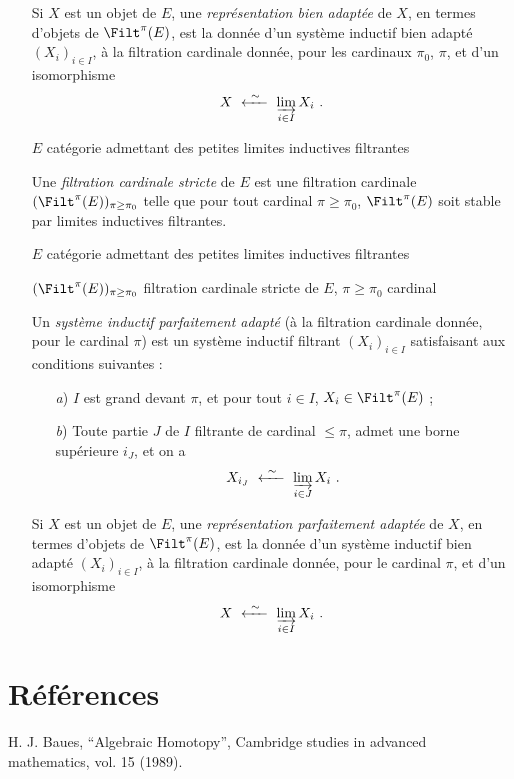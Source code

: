 \begin{itemize}

Si $X$ est un objet de $E$, une \textit{représentation bien adaptée} de $X$, en termes d'objets de $\Filt^{\pi}(E)$, est la donnée d'un système inductif bien adapté $(X_i)_{i\in I}$, à la filtration cardinale donnée, pour les cardinaux $\pi_0$, $\pi$, et d'un isomorphisme
\[
X \ \xleftarrow{\ \sim\ }\ \varinjlim_{i\in I} X_i \ .
\]

\item[\textbullet] $E$ catégorie admettant des petites limites inductives filtrantes

Une \textit{filtration cardinale stricte} de $E$ est une filtration cardinale $(\Filt^{\pi}(E))_{\pi\geq\pi_0}$ telle que pour tout cardinal $\pi \geq \pi_0$, $\Filt^{\pi}(E)$ soit stable par limites inductives filtrantes.

\item[\textbullet] $E$ catégorie admettant des petites limites inductives filtrantes

$(\Filt^{\pi}(E))_{\pi\geq\pi_0}$ filtration cardinale stricte de $E$, \quad $\pi \geq \pi_0$ cardinal

Un \textit{système inductif parfaitement adapté} (à la filtration cardinale donnée, pour le cardinal $\pi$) est un système inductif filtrant $(X_i)_{i\in I}$ satisfaisant aux conditions suivantes :
\begin{itemize}
\item[\textit{a})] $I$ est grand devant $\pi$, et pour tout $i \in I$, $X_i \in \Filt^{\pi}(E)$ ;
\item[\textit{b})] Toute partie $J$ de $I$ filtrante de cardinal $\leq \pi$, admet une borne supérieure $i_J$, et on a
\[
X_{i_J} \ \xleftarrow{\ \sim\ }\ \varinjlim_{i\in J} X_i \ .
\]
\end{itemize}
Si $X$ est un objet de $E$, une \textit{représentation parfaitement adaptée} de $X$, en termes d'objets de $\Filt^{\pi}(E)$, est la donnée d'un système inductif bien adapté $(X_i)_{i\in I}$, à la filtration cardinale donnée, pour le cardinal $\pi$, et d'un isomorphisme
\[
X \ \xleftarrow{\ \sim\ }\ \varinjlim_{i\in I} X_i \ .
\]
\end{itemize}


\section*{Références}

\noindent H. J. Baues, ``Algebraic Homotopy'', Cambridge studies in advanced mathematics, vol. 15 (1989).


